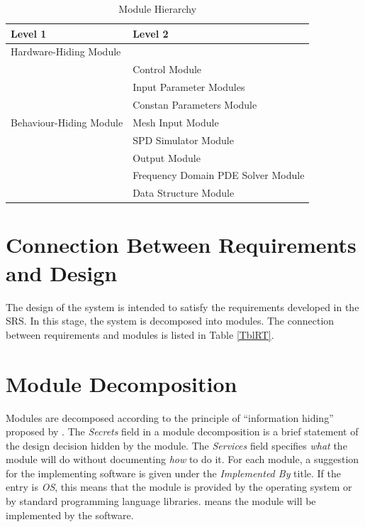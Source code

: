 \documentclass[12pt, titlepage]{article}
\begin{document}
\begin{table}[h!]
\centering
\begin{tabular}{p{} p{}}
\toprule
\textbf{Level 1} & \textbf{Level 2}\\
\midrule

{Hardware-Hiding Module} & ~ \\
\midrule

\multirow{7}{0.3\textwidth}{Behaviour-Hiding Module} & \progname{} Control Module\\
& Input Parameter Modules\\ 
& Constan Parameters Module\\
& Mesh Input Module\\
& SPD Simulator Module\\
& Output Module\\ 

\midrule

\multirow{3}{0.3\textwidth}{Software Decision Module} 
& Frequency Domain PDE Solver Module\\
& Data Structure Module\\
\bottomrule

\end{tabular}
\caption{Module Hierarchy}
\label{TblMH}
\end{table}

\section{Connection Between Requirements and Design} \label{SecConnection}

The design of the system is intended to satisfy the requirements developed in
the SRS. In this stage, the system is decomposed into modules. The connection
between requirements and modules is listed in Table \ref{TblRT}.


\section{Module Decomposition} \label{SecMD}

Modules are decomposed according to the principle of ``information hiding''
proposed by \citet{ParnasEtAl1984}. The \emph{Secrets} field in a module
decomposition is a brief statement of the design decision hidden by the
module. The \emph{Services} field specifies \emph{what} the module will do
without documenting \emph{how} to do it. For each module, a suggestion for the 
implementing software is given under the \emph{Implemented By} title. If the
entry is \emph{OS}, this means that the module is provided by the operating
system or by standard programming language libraries.  \emph{\progname{}} means the
module will be implemented by the \progname{} software.
\end{document}

